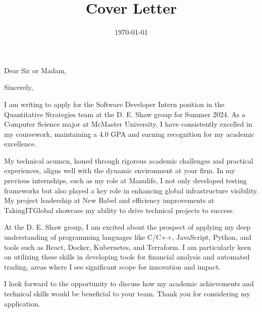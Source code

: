 \documentclass[11pt, letterpaper, sans]{moderncv}
\title{Cover Letter}
\begin{document}
\clearpage

\newcommand{\positionname}{Software Developer Intern} %
\newcommand{\companyname}{D. E. Shaw Group} %

\recipient{Hiring Manager}{\companyname{}} %
\date{\today} %
\opening{Dear Sir or Madam,} %
\closing{Sincerely,} %

\makelettertitle %

I am writing to apply for the Software Developer Intern position
in the Quantitative Strategies team at the D. E. Shaw group for Summer 2024.
As a Computer Science major at McMaster University,
I have consistently excelled in my coursework,
maintaining a 4.0 GPA and earning recognition for my academic excellence.

My technical acumen, honed through rigorous academic challenges and practical experiences,
aligns well with the dynamic environment at your firm.
In my previous internships, such as my role at Manulife,
I not only developed testing frameworks but also played a key role in enhancing global infrastructure visibility.
My project leadership at New Babel and efficiency improvements at TakingITGlobal showcase my ability to drive technical projects to success.

At the D. E. Shaw group, I am excited about the prospect
of applying my deep understanding of programming languages like
C/C++, JavaScript, Python, and tools such as React, Docker, Kubernetes, and Terraform.
I am particularly keen on utilizing these skills in developing tools for financial analysis and automated trading,
areas where I see significant scope for innovation and impact.

I look forward to the opportunity to discuss how my academic achievements and technical skills
would be beneficial to your team. Thank you for considering my application.

\makeletterclosing %

\newpage
\end{document}
